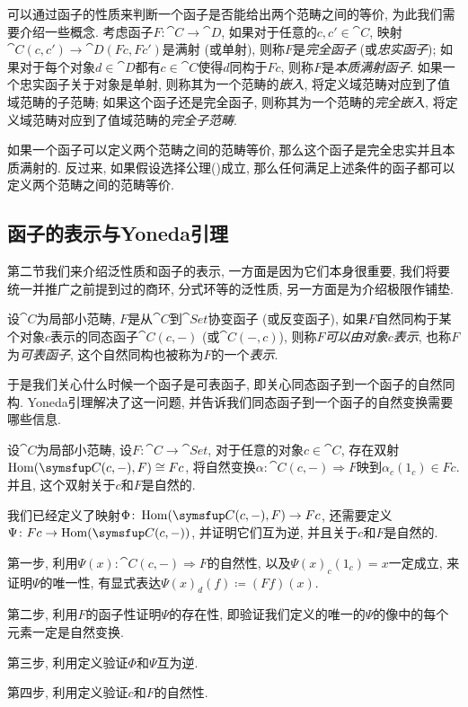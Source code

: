 可以通过函子的性质来判断一个函子是否能给出两个范畴之间的等价, 为此我们需要介绍一些概念. 考虑函子$F\colon\cat{C}\to\cat{D}$, 如果对于任意的$c, c'\in \cat{C}$, 映射$\cat{C}(c, c')\to \cat{D}(Fc, Fc')$是满射 (或单射), 则称$F$是\emph{完全函子} (或\emph{忠实函子}); 如果对于每个对象$d\in \cat{D}$都有$c\in\cat{C}$使得$d$同构于$Fc$, 则称$F$是\emph{本质满射函子}. 如果一个忠实函子关于对象是单射, 则称其为一个范畴的\emph{嵌入}, 将定义域范畴对应到了值域范畴的子范畴; 如果这个函子还是完全函子, 则称其为一个范畴的\emph{完全嵌入}, 将定义域范畴对应到了值域范畴的\emph{完全子范畴}.

\begin{theoremnoproof}\label{thm:categoryequivalence}
  如果一个函子可以定义两个范畴之间的范畴等价, 那么这个函子是完全忠实并且本质满射的. 反过来, 如果假设选择公理()成立, 那么任何满足上述条件的函子都可以定义两个范畴之间的范畴等价.
\end{theoremnoproof}

\subsection{函子的表示与Yoneda引理}

第二节我们来介绍泛性质和函子的表示, 一方面是因为它们本身很重要, 我们将要统一并推广之前提到过的商环, 分式环等的泛性质, 另一方面是为介绍极限作铺垫.

设$\cat{C}$为局部小范畴, $F$是从$\cat{C}$到$\cat{Set}$协变函子 (或反变函子), 如果$F$自然同构于某个对象$c$表示的同态函子$\cat{C}(c, -)$ (或$\cat{C}(-, c)$), 则称$F$\emph{可以由对象$c$表示}, 也称$F$为\emph{可表函子}, 这个自然同构也被称为$F$的一个\emph{表示}.

于是我们关心什么时候一个函子是可表函子, 即关心同态函子到一个函子的自然同构. Yoneda引理解决了这一问题, 并告诉我们同态函子到一个函子的自然变换需要哪些信息.

\begin{theorem}\label{thm:yonedalemma}
  设$\cat{C}$为局部小范畴, 设$F\colon \cat{C}\to\cat{Set}$, 对于任意的对象$c\in\cat{C}$, 存在双射$\Hom (\cat{C}(c, -), F)\cong Fc$, 将自然变换$\alpha\colon \cat{C}(c, -)\Rightarrow F$映到$\alpha_c(1_c)\in Fc$. 并且, 这个双射关于$c$和$F$是自然的.
\end{theorem}

\begin{proofhint}
  我们已经定义了映射$\Phi\colon \Hom (\cat{C}(c, -), F)\to Fc$, 还需要定义$\Psi\colon Fc\to\Hom (\cat{C}(c, -))$, 并证明它们互为逆, 并且关于$c$和$F$是自然的.

  第一步, 利用$\Psi(x)\colon \cat{C}(c, -)\Rightarrow F$的自然性, 以及$\Psi(x)_c(1_c)=x$一定成立, 来证明$\Psi$的唯一性, 有显式表达$\Psi(x)_d(f)\coloneq (Ff)(x)$.

  第二步, 利用$F$的函子性证明$\Psi$的存在性, 即验证我们定义的唯一的$\Psi$的像中的每个元素一定是自然变换.

  第三步, 利用定义验证$\Phi$和$\Psi$互为逆.

  第四步, 利用定义验证$c$和$F$的自然性.
\end{proofhint}

